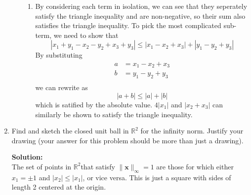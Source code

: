 \documentclass[]{article}
\newcommand{\R}{\mathbb{R}}
\newcommand{\solution}{\vskip 0.5cm \textbf{\large Solution:} \\}
\begin{document}
\begin{enumerate}[resume]
\begin{enumerate}
\begin{enumerate}
          \item
            By considering each term in isolation, we can see that
            they seperately satisfy the triangle inequality and are
            non-negative, so their sum also satisfies the triangle
            inequality. To pick the most complicated sub-term, we need
            to show that
            \[
            |x_1 + y_1 - x_2 - y_2 + x_3 + y_3| \leq |x_1 - x_2 + x_3| + |y_1 - y_2 + y_3|
            \]
            By substituting
            \[ \begin{split}
              a &= x_1 - x_2 + x_3 \\
              b &= y_1 - y_2 + y_3 \\
            \end{split} \]
            we can rewrite as
            \[
            |a + b| \leq |a| + |b|
            \]
            which is satified by the absolute value. $4|x_1|$ and
            $|x_2 + x_3|$ can similarly be shown to satisfy the
            triangle inequality.
          \end{enumerate}
	\end{enumerate}

    \newpage

  \item Find and sketch the closed unit ball in $\R^2$ for the
    infinity norm. Justify your drawing (your answer for this problem
    should be more than just a drawing).
    
	\solution The set of points in $\R^2$that satisfy $\| \bm{x}
    \|_{\infty} = 1$ are those for which either $x_1 = \pm 1$ and
    $|x_2| \leq |x_1|$, or vice versa. This is just a square with
    sides of length 2 centered at the origin.


\end{enumerate}
\end{document}
